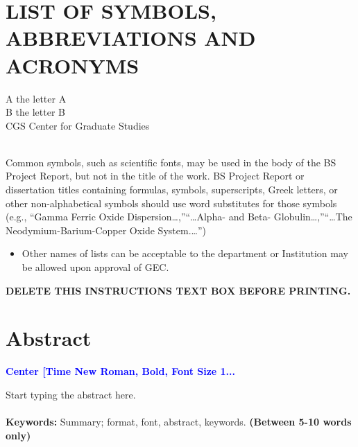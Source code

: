 \documentclass[a4paper,12pt,one side]{report}
\theoremstyle{definition}
\begin{document}
\chapter*{LIST OF SYMBOLS, ABBREVIATIONS AND ACRONYMS}
A	the letter A\\
B	the letter B\\
CGS	Center for Graduate Studies\\~\\

\begin{tcolorbox}[enhanced jigsaw,
    sharp corners,
    boxrule=0.5pt, 
    colback=blue!30!white,   
    borderline={0.5pt}{-2pt}{black,solid} %
 ]
 \begin{justify}
 Common symbols, such as scientific fonts, may be used in the body of the BS Project Report, but not in the title of the work. BS Project Report or dissertation titles containing formulas, symbols, superscripts, Greek letters, or other non-alphabetical symbols should use word substitutes for those symbols (e.g., “Gamma Ferric Oxide Dispersion…,”“…Alpha- and Beta-  Globulin…,”“…The Neodymium-Barium-Copper Oxide System.…”)
\begin{itemize}
    \item Other names of lists can be acceptable to the department or Institution may be allowed upon approval of GEC.
\end{itemize}
{\bf DELETE THIS INSTRUCTIONS TEXT BOX BEFORE PRINTING.}
 \end{justify}
\end{tcolorbox}
\newpage
{}
\chapter*{Abstract}
\begin{center}
    {\small
  \bfseries \textcolor{blue}{Center [Time New Roman, Bold, Font Size 1...}
}
\\
\end{center}
\vspace{1cm}
Start typing the abstract here.\\~\\
{\bf Keywords:}	Summary; format, font, abstract, keywords. {\bf (Between 5-10 words only)}
\end{document}
